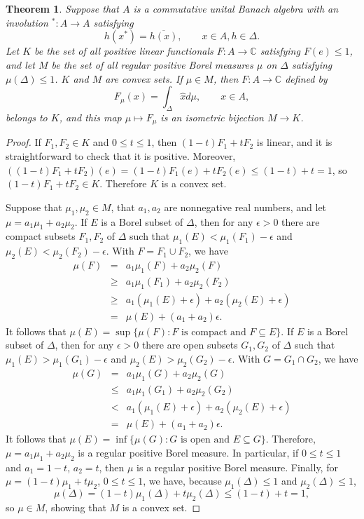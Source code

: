 \documentclass{article}
\newtheorem{theorem}{Theorem}
\theoremstyle{definition}
\begin{document}
\begin{theorem}
Suppose that $A$ is a commutative unital Banach algebra with an involution $^*:A \to A$ satisfying 
\begin{equation}
h(x^*)=\overline{h(x)}, \qquad x \in A, h \in \Delta.
\label{symmetric}
\end{equation}
Let $K$ be the set of all positive linear functionals $F:A \to \mathbb{C}$ satisfying $F(e) \leq 1$, and let
$M$ be the set of all regular positive  Borel measures $\mu$ on $\Delta$ satisfying $\mu(\Delta) \leq 1$. 
$K$ and $M$ are convex sets.
If $\mu \in M$, then $F:A \to \mathbb{C}$ defined by
\[
F_\mu(x) = \int_\Delta \hat{x} d\mu, \qquad x \in A,
\]
belongs to $K$, and this map $\mu \mapsto F_\mu$ is an isometric bijection $M \to K$.
\label{bijection}
\end{theorem}
\begin{proof}
If $F_1,F_2 \in K$ and $0 \leq t \leq 1$, then $(1-t)F_1+tF_2$ is linear, and it is straightforward to check that it is positive. Moreover,
$((1-t)F_1+tF_2)(e) = (1-t)F_1(e)+tF_2(e) \leq (1-t)+t =1$, so $(1-t)F_1+tF_2 \in K$. Therefore $K$ is a convex set. 

Suppose that $\mu_1,\mu_2 \in M$, that $a_1,a_2$ are nonnegative real numbers, and let $\mu=a_1\mu_1+a_2\mu_2$.
If $E$ is a Borel subset of $\Delta$, then for any $\epsilon>0$ 
there are compact
subsets $F_1,F_2$ of $\Delta$ such that $\mu_1(E) < \mu_1(F_1)-\epsilon$ and $\mu_2(E)<\mu_2(F_2)-\epsilon$.
With $F=F_1 \cup F_2$, we have
\begin{eqnarray*}
\mu(F) &=&a_1\mu_1(F)+a_2\mu_2(F)\\
&\geq&a_1\mu_1(F_1)+a_2\mu_2(F_2)\\
&\geq&a_1(\mu_1(E)+\epsilon)+a_2(\mu_2(E)+\epsilon)\\
&=&\mu(E)+(a_1+a_2)\epsilon.
\end{eqnarray*}
It follows that $\mu(E) = \sup\{\mu(F): \textrm{$F$ is compact and $F \subseteq E$}\}$. If $E$ is a Borel subset of $\Delta$, then for any $\epsilon>0$ there
are open subsets $G_1,G_2$ of $\Delta$ such that $\mu_1(E)>\mu_1(G_1)-\epsilon$ and $\mu_2(E)>\mu_2(G_2)-\epsilon$.
With $G=G_1 \cap G_2$, we have
\begin{eqnarray*}
\mu(G)&=&a_1\mu_1(G)+a_2\mu_2(G)\\
&\leq&a_1\mu_1(G_1)+a_2\mu_2(G_2)\\
&<&a_1(\mu_1(E)+\epsilon)+a_2(\mu_2(E)+\epsilon)\\
&=&\mu(E)+(a_1+a_2)\epsilon.
\end{eqnarray*}
It follows that $\mu(E)=\inf\{\mu(G): \textrm{$G$ is open and $E \subseteq G$}\}$. 
Therefore, $\mu=a_1\mu_1+a_2\mu_2$ is a regular positive Borel
measure. In particular, if $0 \leq t \leq 1$ and $a_1=1-t$, $a_2=t$, then $\mu$ is a regular positive Borel measure.
Finally, for $\mu=(1-t)\mu_1+t\mu_2$, $0 \leq t \leq 1$, we have, because $\mu_1(\Delta) \leq 1$ and $\mu_2(\Delta) \leq 1$, 
\[
\mu(\Delta) = (1-t)\mu_1(\Delta)+t\mu_2(\Delta) \leq (1-t) +t =1,
\]
so $\mu \in M$, showing that $M$ is a convex set.



\end{proof}
\end{document}
